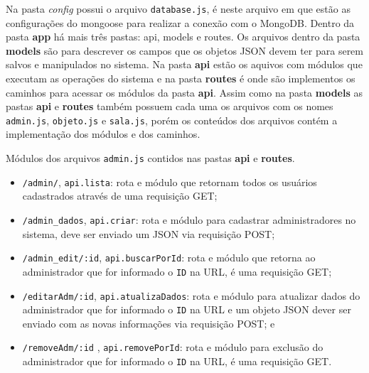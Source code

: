 \par 
Na pasta \textit{config} possui o arquivo  \texttt{database.js}, é neste arquivo em que estão as configurações do mongoose para realizar a conexão com o MongoDB. 
Dentro da pasta  \textbf{app} há mais três pastas: api, models e routes. 
Os arquivos dentro da pasta \textbf{models} são para descrever os campos que os objetos JSON devem ter para serem salvos e manipulados no sistema.
Na pasta \textbf{api} estão os aquivos com módulos que executam as operações do sistema e na pasta \textbf{routes} é onde são implementos os caminhos para acessar os módulos da pasta \textbf{api}. Assim como na pasta \textbf{models} as pastas \textbf{api} e \textbf{routes} também possuem cada uma os arquivos com os nomes \texttt{admin.js}, \texttt{objeto.js} e \texttt{sala.js}, porém os conteúdos dos arquivos contém a implementação dos módulos e dos caminhos.

\par
Módulos dos arquivos \texttt{admin.js} contidos nas pastas \textbf{api} e \textbf{routes}.
\begin{itemize}
    \item \texttt{/admin/}, \texttt{api.lista}:  rota e módulo que retornam todos os usuários cadastrados através de uma requisição GET;

    \item \texttt{/admin\_dados}, \texttt{api.criar}: rota e módulo para cadastrar administradores no sistema, deve ser enviado um JSON via requisição POST;
    
    \item \texttt{/admin\_edit/:id}, \texttt{api.buscarPorId}: rota e módulo que retorna ao administrador que for informado o \texttt{ID} na URL, é uma requisição GET;
    
    \item \texttt{/editarAdm/:id}, \texttt{api.atualizaDados}: rota e módulo para atualizar dados do administrador que for informado o \texttt{ID} na URL e um objeto JSON dever ser enviado com as novas informações via requisição POST; e
    
    \item \texttt{/removeAdm/:id} , \texttt{api.removePorId}: rota e módulo para exclusão do administrador que for informado o \texttt{ID} na URL, é uma requisição GET.
\end{itemize}


